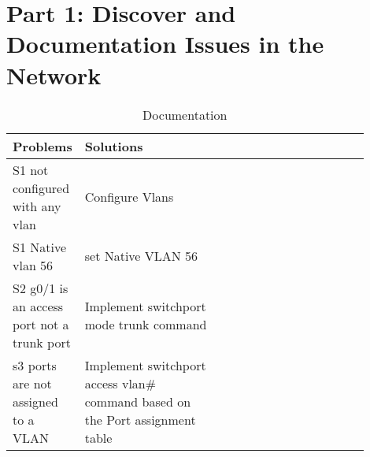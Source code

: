 \documentclass{report}
\title{\classinfo}
\author{\semester}
\date{\today}
\newcommand{\mysection}[1]{\section*{#1}}
\begin{document}
\maketitle

\mysection{\textbf{Part 1: Discover and Documentation Issues in the Network}}

\begin{table}[!h]
  \caption{Documentation}
  \label{tab:Doc12}
  \begin{tabular}{lp{0.45\linewidth}| lp{0.45\linewidth}p{1in}}
    \textbf{Problems} & \textbf{Solutions}\\\hline
    S1 not configured with any vlan & Configure Vlans\\
    S1 Native vlan 56 & set Native VLAN 56\\
    S2 g0/1 is an access port not a trunk port & Implement switchport mode trunk command\\
    s3 ports are not assigned to a VLAN & Implement switchport access vlan\#
    command based on the Port assignment table\\
  \end{tabular}
\end{table}
\end{document}
